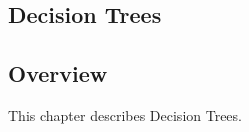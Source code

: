 

\renewcommand{\bibsection}{\subsection{\bibname}}
\begin{bibunit}

\chapter{Decision Trees}
\label{ch:trees}

\section{Overview}
This chapter describes Decision Trees.




\putbib
\end{bibunit}


\newpage\begin{bibunit}\putbib\end{bibunit}

